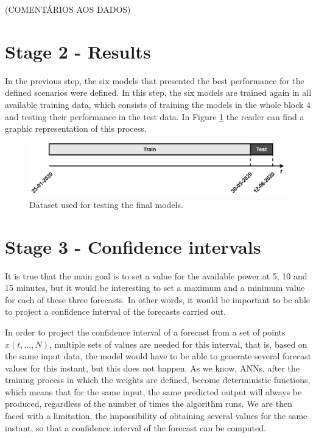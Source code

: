 (COMENTÁRIOS AOS DADOS)

\section{Stage 2 - Results}\label{chap3:section:stage_2}

In the previous step, the six models that presented the best performance for the defined scenarios were defined. In this step, the six models are trained again in all available training data, which consists of training the models in the whole block 4 and testing their performance in the test data. In Figure \ref{test} the reader can find a graphic representation of this process.

\begin{figure}[h!]
    \centering
    \begin{center}
    \includegraphics[width=1\textwidth]{Images/test2.png}
    \caption{Dataset used for testing the final models.}
    \label{test}
    \end{center}
\end{figure}

\section{Stage 3 - Confidence intervals}\label{chap3:section:stage_3}

It is true that the main goal is to set a value for the available power at 5, 10 and 15 minutes, but it would be interesting to set a maximum and a minimum value for each of these three forecasts. In other words, it would be important to be able to project a confidence interval of the forecasts carried out. 

In order to project the confidence interval of a forecast from a set of points $x(t, ..., N)$, multiple sets of values are needed for this interval, that is, based on the same input data, the model would have to be able to generate several forecast values for this instant, but this does not happen. As we know, \ac{ANNs}, after the training process in which the weights are defined, become deterministic functions, which means that for the same input, the same predicted output will always be produced, regardless of the number of times the algorithm runs. We are then faced with a limitation, the impossibility of obtaining several values for the same instant, so that a confidence interval of the forecast can be computed.

